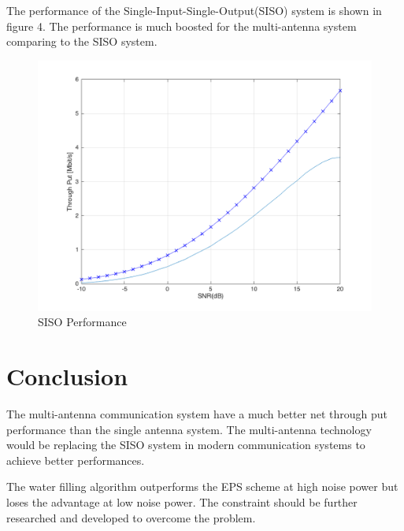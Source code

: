 \documentclass{article}
\begin{document}
The performance of the Single-Input-Single-Output(SISO) system is shown in figure 4. The performance is much boosted for the multi-antenna system comparing to the SISO system.
\begin{figure}[ht]
\centering
\includegraphics[scale=0.25]{FadingSISO.png}
\caption{SISO Performance}
\label{fig:WFvsEPS}
\end{figure}


\section{Conclusion}
The multi-antenna communication system have a much better net through put performance than the single antenna system. The multi-antenna technology would be replacing the SISO system in modern communication systems to achieve better performances.

The water filling algorithm outperforms the EPS scheme at high noise power but loses the advantage at low noise power. The constraint should be further researched and developed to overcome the problem.
\end{document}
